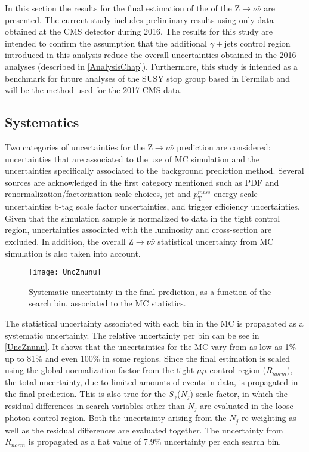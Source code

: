 	
	
	
In this section the results for the final estimation of the of the Z$\rightarrow\nu\bar{\nu}$ are presented. The current study includes preliminary results using only data obtained at the CMS detector during 2016. The results for this study are intended to confirm the assumption that the additional $\gamma+$jets control region introduced in this analysis reduce the overall uncertainties obtained in the 2016 analyses (described in \autoref{AnalysisChap}). Furthermore, this study is intended as a benchmark for future analyses of the SUSY stop group based in Fermilab and will be the method used for the 2017 CMS data.

\subsection{Systematics}\label{systematics}

Two categories of uncertainties for the Z$\rightarrow\nu\bar{\nu}$ prediction are considered: uncertainties that are associated to the use of MC simulation and the uncertainties specifically associated to the background prediction method. Several sources are acknowledged in the first category mentioned such as PDF and renormalization/factorization scale choices, jet and $p_\text{T}^{miss}$ energy scale uncertainties b-tag scale factor uncertainties, and trigger efficiency uncertainties. Given that the simulation sample is normalized to data in the tight control region, uncertainties associated with the luminosity and cross-section are excluded. In addition, the overall Z$\rightarrow\nu\bar{\nu}$ statistical uncertainty from MC simulation is also taken into account.\\

\begin{figure}[H]
\begin{center}
\texttt{[image: UncZnunu]}
\end{center}
\vspace{-1em}
\caption{Systematic uncertainty in the final prediction, as a function of the search bin, associated to the MC statistics.}
\label{UncZnunu}
\end{figure}

The statistical uncertainty associated with each bin in the MC is propagated as a systematic uncertainty. The relative uncertainty per bin can be see in \autoref{UncZnunu}. It shows that the uncertainties for the MC vary from as low as 1\% up to 81\% and even 100\% in some regions. Since the final estimation is scaled using the global normalization factor from the tight $\mu\mu$ control region ($R_{norm}$), the total uncertainty, due to limited amounts of events in data, is propagated in the final prediction. This is also true for the $S_\gamma$($N_j$) scale factor, in which the residual differences in search variables other than $N_j$ are evaluated in the loose photon control region. Both the uncertainty arising from the $N_j$ re-weighting as well as the residual differences are evaluated together. The uncertainty from $R_{norm}$ is propagated as a flat value of 7.9\% uncertainty per each search bin.

